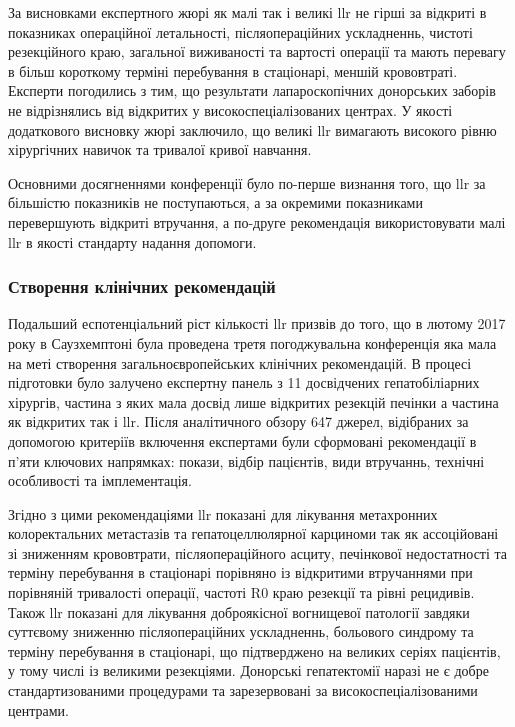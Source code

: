 \begin{refsection}
За висновками експертного жюрі як малі так і великі \acrshort{llr} не гірші за відкриті в показниках операційної летальності, післяопераційних ускладненнь, чистоті резекційного краю, загальної виживаності та вартості операції та мають перевагу в більш короткому терміні перебування в стаціонарі, меншій крововтраті. Експерти погодились з тим, що результати лапароскопічних донорських заборів не відрізнялись від відкритих у високоспеціалізованих центрах. У якості додаткового висновку жюрі заключило, що великі \acrshort{llr} вимагають високого рівню хірургічних навичок та тривалої кривої навчання.

Основними досягненнями конференції було по-перше визнання того, що  \acrshort{llr} за більшістю показників не поступаються, а за окремими показниками перевершують відкриті втручання, а по-друге рекомендація використовувати малі \acrshort{llr} в якості стандарту надання допомоги.

\subsubsection{Створення клінічних рекомендацій} 
Подальший еспотенціальний ріст кількості \acrshort{llr} призвів до того, що в лютому 2017 року в Саузхемптоні була проведена третя погоджувальна конференція \cite{AbuHilal2017a} яка мала на меті створення загальноєвропейських клінічних рекомендацій. В процесі підготовки було залучено експертну панель з 11 досвідчених гепатобіліарних хірургів, частина з яких мала досвід лише відкритих резекцій печінки а частина як відкритих так і \acrshort{llr}. Після аналітичного обзору 647 джерел, відібраних за допомогою критеріїв включення експертами були сформовані рекомендації в п'яти ключових напрямках: покази, відбір пацієнтів, види втручаннь, технічні особливості та імплементація.

Згідно з цими рекомендаціями \acrshort{llr} показані для лікування метахронних колоректальних метастазів та гепатоцеллюлярної карциноми так як ассоційовані зі зниженням крововтрати, післяопераційного асциту, печінкової недостатності та терміну перебування в стаціонарі порівняно із відкритими втручаннями при порівняній тривалості операції, частоті R0 краю резекції та рівні рецидивів. Також \acrshort{llr} показані для лікування доброякісної вогнищевої патології завдяки суттєвому зниженню післяопераційних ускладненнь, больового синдрому та терміну перебування в стаціонарі, що підтверджено на великих серіях пацієнтів, у тому числі із великими резекціями. Донорські гепатектомії наразі не є добре стандартизованими процедурами та зарезервовані за високоспеціалізованими центрами.


\end{refsection}
